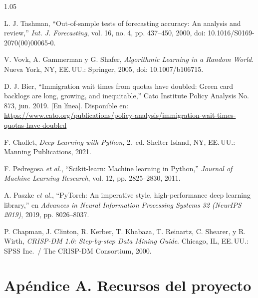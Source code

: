 \documentclass[12pt,letterpaper]{report}
\begin{document}
\begin{spacing}{1.05}
\begin{enumerate}[label={[\arabic*]}, leftmargin=0.9cm, labelsep=0.3cm, itemsep=4pt, parsep=0pt, topsep=0pt]
    \item \label{bib:58} L. J. Tashman, ``Out-of-sample tests of forecasting accuracy: An analysis and review,'' \textit{Int. J. Forecasting}, vol. 16, no. 4, pp. 437--450, 2000, doi: 10.1016/S0169-2070(00)00065-0.

    \item \label{bib:59} V. Vovk, A. Gammerman y G. Shafer, \textit{Algorithmic Learning in a Random World}. Nueva York, NY, EE.\,UU.: Springer, 2005, doi: 10.1007/b106715.

    \item \label{bib:60} D. J. Bier, ``Immigration wait times from quotas have doubled: Green card backlogs are long, growing, and inequitable,'' Cato Institute Policy Analysis No. 873, jun. 2019. [En línea]. Disponible en: \url{https://www.cato.org/publications/policy-analysis/immigration-wait-times-quotas-have-doubled}

    \item \label{bib:61} F. Chollet, \textit{Deep Learning with Python}, 2.\textordfeminine\ ed. Shelter Island, NY, EE.\,UU.: Manning Publications, 2021.

    \item \label{bib:62} F. Pedregosa \textit{et al.}, ``Scikit-learn: Machine learning in Python,'' \textit{Journal of Machine Learning Research}, vol. 12, pp. 2825--2830, 2011.

    \item \label{bib:63} A. Paszke \textit{et al.}, ``PyTorch: An imperative style, high-performance deep learning library,'' en \textit{Advances in Neural Information Processing Systems 32 (NeurIPS 2019)}, 2019, pp. 8026--8037.

    \item \label{bib:64} P. Chapman, J. Clinton, R. Kerber, T. Khabaza, T. Reinartz, C. Shearer, y R. Wirth, \textit{CRISP-DM 1.0: Step-by-step Data Mining Guide}. Chicago, IL, EE.\,UU.: SPSS Inc.\ / The CRISP-DM Consortium, 2000.

\end{enumerate}
\end{spacing}

\clearpage

\chapter*{Apéndice A. Recursos del proyecto}
\setcounter{section}{0}
\renewcommand{\thesection}{A.\arabic{section}}
\end{document}
